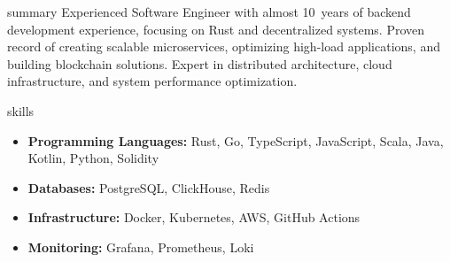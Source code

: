 \documentclass{resume}
\begin{document}
\makeheader
\vspace{0.5cm}

\begin{ResumeSection}{summary}
Experienced Software Engineer with almost 10~years of backend development experience, focusing on Rust and decentralized systems. Proven record of creating scalable microservices, optimizing high-load applications, and building blockchain solutions. Expert in distributed architecture, cloud infrastructure, and system performance optimization.
\end{ResumeSection}

\begin{ResumeSection}{skills}
    \begin{itemize}
        \item \textbf{Programming Languages:} Rust, Go, TypeScript, JavaScript, Scala, Java, Kotlin, Python, Solidity
        \item \textbf{Databases:} PostgreSQL, ClickHouse, Redis
        \item \textbf{Infrastructure:} Docker, Kubernetes, AWS, GitHub Actions
        \item \textbf{Monitoring:} Grafana, Prometheus, Loki
    \end{itemize}
\end{ResumeSection}
\end{document}
